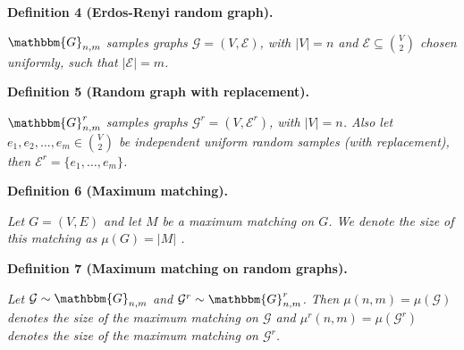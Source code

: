 \documentclass[10pt,a4paper]{article}
\begin{document}


\par\medskip\noindent\textbf{\textbf{Definition 4}\textbf{ }(Erdos-Renyi random graph)\textbf{.}}\par



$\mathbbm{G}_{n,m}$\emph{ samples graphs $\mathcal{G}=(V,\mathcal{E})$, with $|V|=n$ and $\mathcal{E}\subseteq\binom{V}{2}$ chosen uniformly, such that $|\mathcal{E}|=m$.}\par







\par\medskip\noindent\textbf{\textbf{Definition 5}\textbf{ }(Random graph with replacement)\textbf{.}}\par



$\mathbbm{G}^{r}_{n,m}$\emph{ samples graphs $\mathcal{G}^{r}=(V,\mathcal{E}^{r})$, with $|V|=n$. Also let $e_{1},e_{2},\dots,e_{m}\in\binom{V}{2}$ be independent uniform random samples (with replacement), then $\mathcal{E}^{r}=\{e_{1},\dots,e_{m}\}$.}\par







\par\medskip\noindent\textbf{\textbf{Definition 6}\textbf{ }(Maximum matching)\textbf{.}}\par



\emph{Let $G=(V,E)$ and let $M$ be a maximum matching on $G$. We denote the size of this matching as $\mu(G)=|M|$ .}\par







\par\medskip\noindent\textbf{\textbf{Definition 7}\textbf{ }(Maximum matching on random graphs)\textbf{.}}\par



\emph{Let $\mathcal{G}\sim\mathbbm{G}_{n,m}$ and $\mathcal{G}^{r}\sim\mathbbm{G}^{r}_{n,m}$.
Then $\mu(n,m)=\mu(\mathcal{G})$ denotes the size of the maximum matching on $\mathcal{G}$ and $\mu^{r}(n,m)=\mu(\mathcal{G}^{r})$ denotes the size of the maximum matching on $\mathcal{G}^{r}$.}\par
\end{document}
